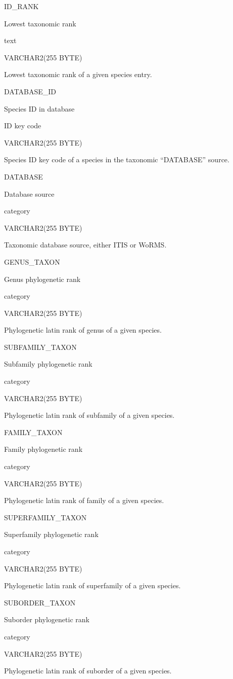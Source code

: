 \documentclass[
  letterpaper,
  oneside,
  open=any]{scrbook}
\begin{document}
ID\_RANK

Lowest taxonomic rank

text

VARCHAR2(255 BYTE)

Lowest taxonomic rank of a given species entry.

DATABASE\_ID

Species ID in database

ID key code

VARCHAR2(255 BYTE)

Species ID key code of a species in the taxonomic ``DATABASE'' source.

DATABASE

Database source

category

VARCHAR2(255 BYTE)

Taxonomic database source, either ITIS or WoRMS.

GENUS\_TAXON

Genus phylogenetic rank

category

VARCHAR2(255 BYTE)

Phylogenetic latin rank of genus of a given species.

SUBFAMILY\_TAXON

Subfamily phylogenetic rank

category

VARCHAR2(255 BYTE)

Phylogenetic latin rank of subfamily of a given species.

FAMILY\_TAXON

Family phylogenetic rank

category

VARCHAR2(255 BYTE)

Phylogenetic latin rank of family of a given species.

SUPERFAMILY\_TAXON

Superfamily phylogenetic rank

category

VARCHAR2(255 BYTE)

Phylogenetic latin rank of superfamily of a given species.

SUBORDER\_TAXON

Suborder phylogenetic rank

category

VARCHAR2(255 BYTE)

Phylogenetic latin rank of suborder of a given species.
\end{document}
